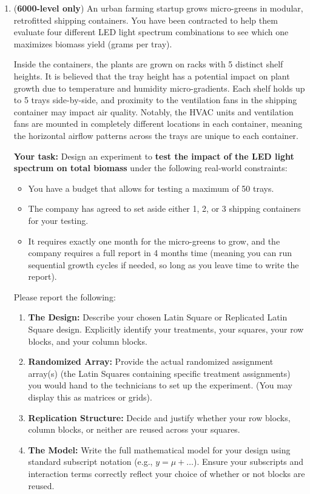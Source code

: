\documentclass[10pt,twoside]{article}\usepackage[]{graphicx}\usepackage[dvipsnames,svgnames,table]{xcolor}
\begin{document}
\begin{enumerate}
\item (\textbf{6000-level only}) An urban farming startup grows micro-greens in modular, retrofitted shipping containers. You have been contracted to help them evaluate four different LED light spectrum combinations to see which one maximizes biomass yield (grams per tray).
  
  Inside the containers, the plants are grown on racks with 5 distinct shelf heights.
  It is believed that the tray height has a potential impact on plant growth due to temperature and humidity micro-gradients. 
  Each shelf holds up to 5 trays side-by-side, and proximity to the ventilation fans in the shipping container may impact air quality.
  Notably, the HVAC units and ventilation fans are mounted in completely different locations in each container, meaning the horizontal airflow patterns across the trays are unique to each container.
  
  \textbf{Your task:} Design an experiment to \textbf{test the impact of the LED light spectrum on total biomass} under the following real-world constraints:
  \begin{itemize}
      \item You have a budget that allows for testing a maximum of 50 trays.
      \item The company has agreed to set aside either 1, 2, or 3 shipping containers for your testing. 
      \item It requires exactly one month for the micro-greens to grow, and the company requires a full report in 4 months time (meaning you can run sequential growth cycles if needed, so long as you leave time to write the report). 
  \end{itemize}
  
  Please report the following:
  \begin{enumerate}
    \item \textbf{The Design:} Describe your chosen Latin Square or Replicated Latin Square design. Explicitly identify your treatments, your squares, your row blocks, and your column blocks. 
    \item \textbf{Randomized Array:} Provide the actual randomized assignment array(s) (the Latin Squares containing specific treatment assignments) you would hand to the technicians to set up the experiment. (You may display this as matrices or grids).
    \item \textbf{Replication Structure:} Decide and justify whether your row blocks, column blocks, or neither are reused across your squares.
    \item \textbf{The Model:} Write the full mathematical model for your design using standard subscript notation (e.g., $y = \mu + \dots$). Ensure your subscripts and interaction terms correctly reflect your choice of whether or not blocks are reused.
  \end{enumerate}

\end{enumerate}
\end{document}
